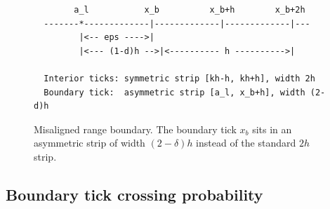 \documentclass[11pt]{article}
\theoremstyle{definition}
\theoremstyle{remark}
\begin{document}
\begin{figure}[h]
\centering
\begin{minipage}{0.9\textwidth}
\small
\begin{verbatim}
        a_l           x_b          x_b+h        x_b+2h
  -------*-------------|-------------|-------------|---
         |<-- eps ---->|
         |<--- (1-d)h -->|<---------- h ---------->|

  Interior ticks: symmetric strip [kh-h, kh+h], width 2h
  Boundary tick:  asymmetric strip [a_l, x_b+h], width (2-d)h
\end{verbatim}
\end{minipage}
\caption{Misaligned range boundary. The boundary tick $x_b$ sits in
an asymmetric strip of width $(2-\delta)h$ instead of the standard
$2h$ strip.}
\label{fig:misaligned}
\end{figure}

\subsection{Boundary tick crossing probability}
\end{document}
